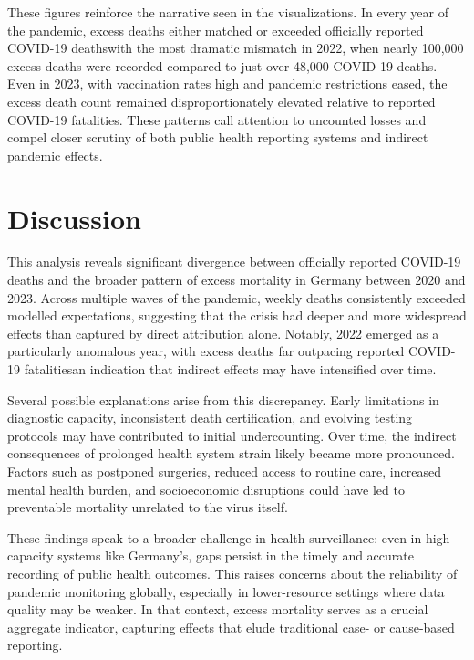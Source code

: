 \documentclass[a4paper,11pt]{article}
\begin{document}
These figures reinforce the narrative seen in the visualizations. In every year of the pandemic, excess deaths either matched or exceeded officially reported COVID-19 deaths\textemdash with the most dramatic mismatch in 2022, when nearly 100,000 excess deaths were recorded compared to just over 48,000 COVID-19 deaths. Even in 2023, with vaccination rates high and pandemic restrictions eased, the excess death count remained disproportionately elevated relative to reported COVID-19 fatalities. These patterns call attention to uncounted losses and compel closer scrutiny of both public health reporting systems and indirect pandemic effects.

\section{Discussion}

This analysis reveals significant divergence between officially reported COVID-19 deaths and the broader pattern of excess mortality in Germany between 2020 and 2023. Across multiple waves of the pandemic, weekly deaths consistently exceeded modelled expectations, suggesting that the crisis had deeper and more widespread effects than captured by direct attribution alone. Notably, 2022 emerged as a particularly anomalous year, with excess deaths far outpacing reported COVID-19 fatalities\textemdash an indication that indirect effects may have intensified over time.

Several possible explanations arise from this discrepancy. Early limitations in diagnostic capacity, inconsistent death certification, and evolving testing protocols may have contributed to initial undercounting. Over time, the indirect consequences of prolonged health system strain likely became more pronounced. Factors such as postponed surgeries, reduced access to routine care, increased mental health burden, and socioeconomic disruptions could have led to preventable mortality unrelated to the virus itself.

These findings speak to a broader challenge in health surveillance: even in high-capacity systems like Germany's, gaps persist in the timely and accurate recording of public health outcomes. This raises concerns about the reliability of pandemic monitoring globally, especially in lower-resource settings where data quality may be weaker. In that context, excess mortality serves as a crucial aggregate indicator, capturing effects that elude traditional case- or cause-based reporting.
\end{document}
